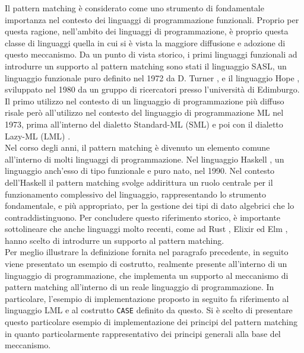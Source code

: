 Il pattern matching è considerato come uno strumento di fondamentale importanza
nel contesto dei linguaggi di programmazione funzionali. Proprio per questa
ragione, nell’ambito dei linguaggi di programmazione, è proprio questa classe di
linguaggi quella in cui si è vista la maggiore diffusione e adozione di questo
meccanismo. Da un punto di vista storico, i primi linguaggi funzionali ad
introdurre un supporto al pattern matching sono stati il linguaggio SASL, un
linguaggio funzionale puro definito nel 1972 da D. Turner
\cite{DBLP:journals/spe/Turner79}, e il linguaggio Hope
\cite{DBLP:conf/lfp/BurstallMS80}, sviluppato nel 1980 da un gruppo di
ricercatori presso l'università di Edimburgo. Il primo utilizzo nel contesto di
un linguaggio di programmazione più diffuso risale però all’utilizzo nel
contesto del linguaggio di programmazione ML nel 1973, prima all’interno del
dialetto Standard-ML (SML) \cite{milner1997definition} e poi con il dialetto
Lazy-ML (LML) \cite{DBLP:conf/lfp/Augustsson84}.\\

Nel corso degli anni, il pattern matching è divenuto un elemento comune
all'interno di molti linguaggi di programmazione. Nel linguaggio Haskell
\cite{DBLP:conf/hopl/HudakHJW07}, un linguaggio anch'esso di tipo funzionale e
puro nato, nel 1990. Nel contesto dell'Haskell il pattern matching svolge
addirittura un ruolo centrale per il funzionamento complessivo del linguaggio,
rappresentando lo strumento fondamentale, e più appropriato, per la gestione dei
tipi di dato algebrici che lo contraddistinguono. Per concludere questo
riferimento storico, è importante sottolineare che anche linguaggi molto
recenti, come ad Rust \cite{rust2016}, Elixir \cite{laurent2014introducing} ed
Elm \cite{elm2016}, hanno scelto di introdurre un supporto al pattern
matching.\\

Per meglio illustrare la definizione fornita nel paragrafo precedente, in
seguito viene presentato un esempio di costrutto, realmente presente all'interno
di un linguaggio di programmazione, che implementa un supporto al meccanismo di
pattern matching all'interno di un reale linguaggio di programmazione. In
particolare, l'esempio di implementazione proposto in seguito fa riferimento al
linguaggio LML e al costrutto \texttt{CASE} definito da questo. Si è scelto di
presentare questo particolare esempio di implementazione dei principi del
pattern matching in quanto particolarmente rappresentativo dei principi generali
alla base del meccanismo.

